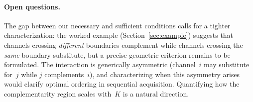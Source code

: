 \paragraph{Open questions.}
The gap between our necessary and sufficient conditions calls for a tighter characterization: the worked example (Section~\ref{sec:example}) suggests that channels crossing \emph{different} boundaries complement while channels crossing the \emph{same} boundary substitute, but a precise geometric criterion remains to be formulated.
The interaction is generically asymmetric (channel~$i$ may substitute for~$j$ while $j$ complements~$i$), and characterizing when this asymmetry arises would clarify optimal ordering in sequential acquisition.
Quantifying how the complementarity region scales with~$K$ is a natural direction.
